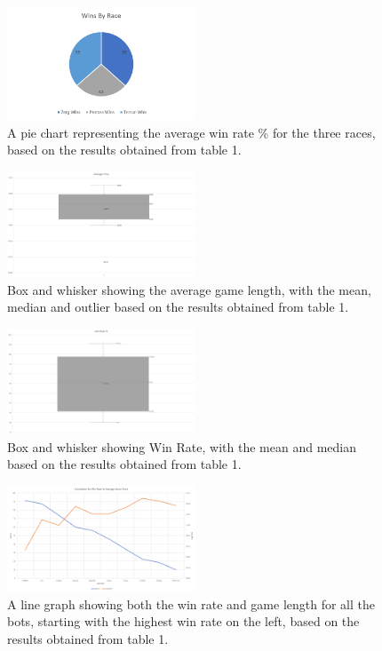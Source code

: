 \documentclass[journal]{IEEEtran}
\begin{document}
\begin{figure}[H]
	\centering
	\includegraphics[width=0.5\textwidth]{RacePie}
	\caption{A pie chart representing the average win rate \% for the three races, based on the results obtained from table 1.}
	\label{Fig4}
\end{figure}
\begin{figure}[H]
	\centering
	\includegraphics[width=0.5\textwidth]{AvgTimeBarBot}
	\caption{Box and whisker showing the average game length, with the mean, median and outlier based on the results obtained from table 1.}
	\label{Fig5}
\end{figure}
\begin{figure}[H]
	\centering
	\includegraphics[width=0.5\textwidth]{WinBarBot}
	\caption{Box and whisker showing Win Rate, with the mean and median based on the results obtained from table 1.}
	\label{Fig6}
\end{figure}
\begin{figure}[H]
	\centering
	\includegraphics[width=0.5\textwidth]{WinTimeLineWithBot}
	\caption{A line graph showing both the win rate and game length for all the bots, starting with the highest win rate on the left, based on the results obtained from table 1.}
	\label{Fig7}
\end{figure}
\end{document}
